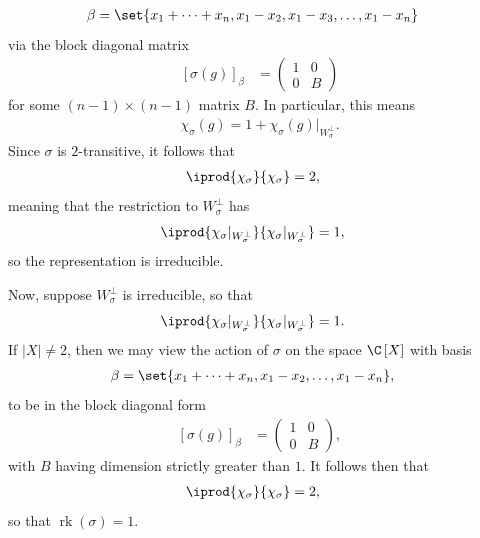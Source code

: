 \documentclass[10pt]{mypackage}
\begin{document}
\begin{solution}
\begin{enumerate}[(a)]
      \begin{align*}
        \beta &= \set{x_1 + \cdots + x_n,x_1-x_2,x_1-x_3,\dots,x_1-x_n}
      \end{align*}
      via the block diagonal matrix
      \begin{align*}
        \left[ \sigma\left( g \right) \right]_{\beta} &= \begin{pmatrix}1 & 0 \\ 0 & B\end{pmatrix}
      \end{align*}
      for some $\left( n-1 \right)\times \left( n-1 \right)$ matrix $B$. In particular, this means 
      \begin{align*}
        \chi_{\sigma}(g) = 1 + \chi_{\sigma}\left( g \right)|_{W_{\sigma}^{\perp}}.
      \end{align*}
      Since $\sigma$ is $2$-transitive, it follows that
      \begin{align*}
        \iprod{\chi_{\sigma}}{\chi_{\sigma}} &= 2,
      \end{align*}
      meaning that the restriction to $W_{\sigma}^{\perp}$ has
      \begin{align*}
        \iprod{\chi_{\sigma}|_{W_{\sigma}^{\perp}}}{\chi_{\sigma}|_{W_{\sigma}^{\perp}}} &= 1,
      \end{align*}
      so the representation is irreducible.

      Now, suppose $W_{\sigma}^{\perp}$ is irreducible, so that
      \begin{align*}
        \iprod{\chi_{\sigma}|_{W_{\sigma}^{\perp}}}{\chi_{\sigma}|_{W_{\sigma}^{\perp}}} &= 1.
      \end{align*}
      If $\left\vert X \right\vert\neq 2$, then we may view the action of $\sigma$ on the space $\C\left[ X \right]$ with basis
      \begin{align*}
        \beta &= \set{x_1 + \cdots + x_n,x_1-x_2,\dots,x_1-x_n},
      \end{align*}
      to be in the block diagonal form
      \begin{align*}
        \left[ \sigma(g) \right]_{\beta} &= \begin{pmatrix}1 & 0 \\ 0 & B\end{pmatrix},
      \end{align*}
      with $B$ having dimension strictly greater than $1$. It follows then that
      \begin{align*}
        \iprod{\chi_{\sigma}}{\chi_{\sigma}} &= 2,
      \end{align*}
      so that $\operatorname{rk}\left( \sigma \right) = 1$.
  \end{enumerate}
\end{solution}
\end{document}
